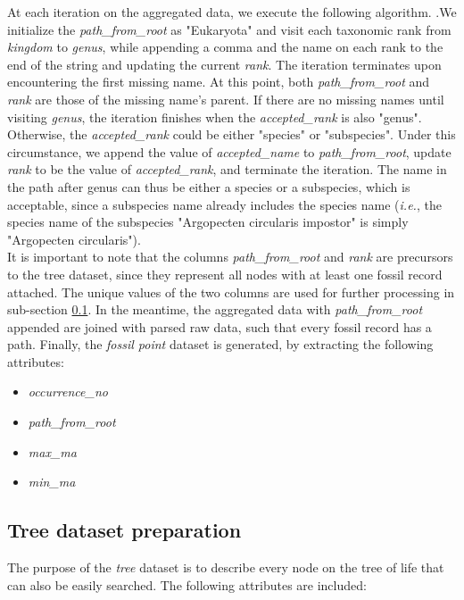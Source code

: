 \documentclass[11pt, a4paper,oneside,chapterprefix=false]{scrbook}
\newcommand{\FIXME}[1]{{\color{RED}{\textbf{FIX}: #1}}}
\begin{document}
At each iteration on the aggregated data, we execute the following algorithm. \FIXME{add pseudocode}.We initialize the \emph{path\_from\_root} as "Eukaryota" and visit each taxonomic rank from \emph{kingdom} to \emph{genus}, while appending a comma and the name on each rank to the end of the string and updating the current \emph{rank}. The iteration terminates upon encountering the first missing name. At this point, both \emph{path\_from\_root} and \emph{rank} are those of the missing name's parent. If there are no missing names until visiting \emph{genus}, the iteration finishes when the \emph{accepted\_rank} is also "genus". Otherwise, the \emph{accepted\_rank} could be either "species" or "subspecies". Under this circumstance, we append the value of \emph{accepted\_name} to \emph{path\_from\_root}, update \emph{rank} to be the value of \emph{accepted\_rank}, and terminate the iteration. The name in the path after genus can thus be either a species or a subspecies, which is acceptable, since a subspecies name already includes the species name (\emph{i.e.}, the species name of the subspecies "Argopecten circularis impostor" is simply "Argopecten circularis"). \\

It is important to note that the columns \emph{path\_from\_root} and \emph{rank} are precursors to the tree dataset, since they represent all nodes with at least one fossil record attached. The unique values of the two columns are used for further processing in sub-section \ref{subsec:tree_preparation}. In the meantime, the aggregated data with \emph{path\_from\_root} appended are joined with parsed raw data, such that every fossil record has a path. Finally, the \emph{fossil point} dataset is generated, by extracting the following attributes: 

\begin{itemize}
	\item \textit{occurrence\_no}
	\item \textit{path\_from\_root}
	\item \textit{max\_ma}
	\item \textit{min\_ma}
\end{itemize}


\subsection{Tree dataset preparation} \label{subsec:tree_preparation}
The purpose of the \emph{tree} dataset is to describe every node on the tree of life that can also be easily searched. The following attributes are included: \\
\end{document}
